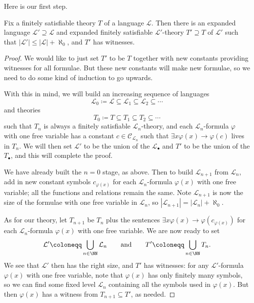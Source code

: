 \documentclass[../notes.tex]{subfiles}
\begin{document}
Here is our first step.
\begin{lemma} \label{lem:extend-for-witnesses}
	Fix a finitely satisfiable theory $T$ of a language $\mathcal L$. Then there is an expanded language $\mathcal L'\supseteq\mathcal L$ and expanded finitely satisfiable $\mathcal L'$-theory $T'\supseteq T$ of $\mathcal L'$ such that $\left|\mathcal L'\right|\le\left|\mathcal L\right|+\aleph_0$, and $T'$ has witnesses.
\end{lemma}
\begin{proof}
	We would like to just set $T'$ to be $T$ together with new constants providing witnesses for all formulae. But these new constants will make new formulae, so we need to do some kind of induction to go upwards.

	With this in mind, we will build an increasing sequence of languages
	\[\mathcal L_0\coloneqq\mathcal L\subseteq\mathcal L_1\subseteq\mathcal L_2\subseteq\cdots\]
	and theories
	\[T_0\coloneqq T\subseteq T_1\subseteq T_2\subseteq\cdots\]
	such that $T_n$ is always a finitely satisfiable $\mathcal L_n$-theory, and each $\mathcal L_n$-formula $\varphi$ with one free variable has a constant $c\in\mathcal C_{\mathcal L_n}$ such that $\exists x\varphi(x)\to\varphi(c)$ lives in $T_n$. We will then set $\mathcal L'$ to be the union of the $\mathcal L_\bullet$ and $T'$ to be the union of the $T_\bullet$, and this will complete the proof.

	We have already built the $n=0$ stage, as above. Then to build $\mathcal L_{n+1}$ from $\mathcal L_n$, add in new constant symbols $c_{\varphi(x)}$ for each $\mathcal L_n$-formula $\varphi(x)$ with one free variable; all the functions and relations remain the same. Note $\mathcal L_{n+1}$ is now the size of the formulae with one free variable in $\mathcal L_n$, so $\left|\mathcal L_{n+1}\right|=\left|\mathcal L_n\right|+\aleph_0$.

	As for our theory, let $T_{n+1}$ be $T_n$ plus the sentences $\exists x\varphi(x)\to\varphi\left(c_{\varphi(x)}\right)$ for each $\mathcal L_n$-formula $\varphi(x)$ with one free variable. We are now ready to set
	\[\mathcal L'\coloneqq\bigcup_{n\in\NN}\mathcal L_n\qquad\text{and}\qquad T'\coloneqq\bigcup_{n\in\NN}T_n.\]
	We see that $\mathcal L'$ then has the right size, and $T'$ has witnesses: for any $\mathcal L'$-formula $\varphi(x)$ with one free variable, note that $\varphi(x)$ has only finitely many symbols, so we can find some fixed level $\mathcal L_n$ containing all the symbols used in $\varphi(x)$. But then $\varphi(x)$ has a witness from $T_{n+1}\subseteq T'$, as needed.


\end{proof}
\end{document}
